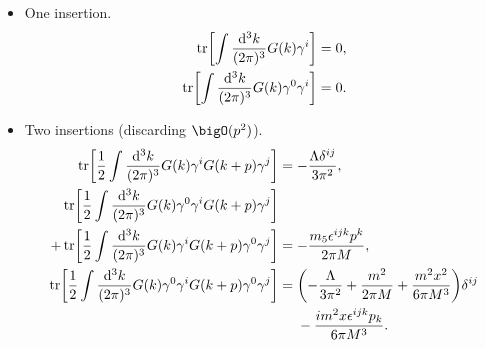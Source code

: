\documentclass{article}
\begin{document}
\begin{itemize}
    \item One insertion.
    \begin{align*}
        \tr[\int \frac{\dd[3]{k}}{(2\pi)^3} G(k) \gamma^i] &= 0, \\
        \tr[\int \frac{\dd[3]{k}}{(2\pi)^3} G(k) \gamma^0 \gamma^i] &= 0.
    \end{align*}
    \item Two insertions (discarding $\bigO(p^2)$).
    \begin{align*}
        \tr[\frac{1}{2} \int \frac{\dd[3]{k}}{(2\pi)^3} G(k) \gamma^i G(k+p)\gamma^j] &= -\frac{\Lambda\delta^{ij}}{3\pi^2}, \\
        \tr[\frac{1}{2} \int \frac{\dd[3]{k}}{(2\pi)^3} G(k) \gamma^0\gamma^i G(k+p)\gamma^j] \\
        + \tr[\frac{1}{2} \int \frac{\dd[3]{k}}{(2\pi)^3} G(k) \gamma^i G(k+p)\gamma^0\gamma^j] &= -\frac{m_5 \epsilon^{ijk} p^k}{2\pi M}, \\
        \tr[\frac{1}{2} \int \frac{\dd[3]{k}}{(2\pi)^3} G(k) \gamma^0\gamma^i G(k+p)\gamma^0\gamma^j] &= \qty(-\frac{\Lambda}{3\pi^2} + \frac{m^2}{2\pi M} + \frac{m^2 x^2}{6\pi M^3})\delta^{ij} \\
        &\phantom{{}={}} - \frac{i m^2 x \epsilon^{ijk}p_k}{6\pi M^3}.
    \end{align*}

\end{itemize}
\end{document}
